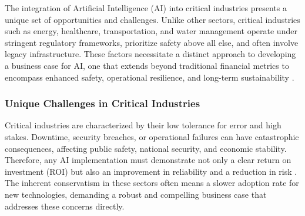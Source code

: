 The integration of Artificial Intelligence (AI) into critical industries presents a unique set of opportunities and challenges. Unlike other sectors, critical industries such as energy, healthcare, transportation, and water management operate under stringent regulatory frameworks, prioritize safety above all else, and often involve legacy infrastructure. These factors necessitate a distinct approach to developing a business case for AI, one that extends beyond traditional financial metrics to encompass enhanced safety, operational resilience, and long-term sustainability \parencite{Smith2017}.

\subsubsection{Unique Challenges in Critical Industries}
Critical industries are characterized by their low tolerance for error and high stakes. Downtime, security breaches, or operational failures can have catastrophic consequences, affecting public safety, national security, and economic stability. Therefore, any AI implementation must demonstrate not only a clear return on investment (ROI) but also an improvement in reliability and a reduction in risk \parencite{Johnson2018}. The inherent conservatism in these sectors often means a slower adoption rate for new technologies, demanding a robust and compelling business case that addresses these concerns directly.

